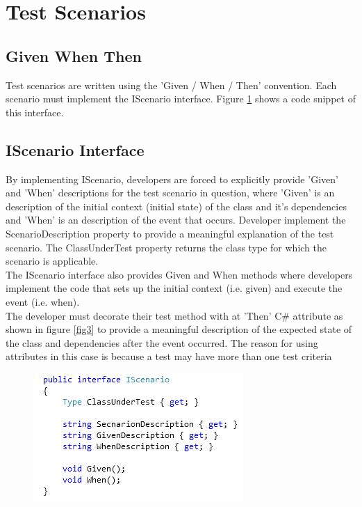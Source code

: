 \documentclass[a4paper,12pt]{article}
\begin{document}
\section{Test Scenarios}
\subsection{Given When Then}
Test scenarios are written using the 'Given / When / Then'\cite{gwt} convention. Each scenario must implement the IScenario interface. Figure \ref{fig2} shows a code snippet of this interface.
\subsection{IScenario Interface}
By implementing IScenario, developers are forced to explicitly provide 'Given' and 'When' descriptions for the test scenario in question, where 'Given' is an description of the initial context (initial state) of the class and it's dependencies and 'When' is an description of the event that occurs. Developer implement the ScenarioDescription property to provide a meaningful explanation of the test scenario. The ClassUnderTest property returns the class type for which the scenario is applicable. \\
\linebreak
The IScenario interface also provides Given and When methods where developers implement the code that sets up the initial context (i.e. given) and execute the event (i.e. when).\\
\linebreak
The developer must decorate their test method with at 'Then' C\# attribute as shown in figure \ref{fig3} to provide a meaningful description of the expected state of the class and dependencies after the event occurred. The reason for using attributes in this case is because a test may have more than one test criteria 

\begin{center}
	\begin{figure}
		\includegraphics{IScenario.JPG}
			\caption{}	
			\label{fig2}       
	\end{figure}	
\end{center}
\end{document}

